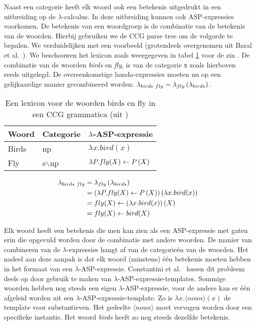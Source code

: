 Naast een categorie heeft elk woord ook een betekenis uitgedrukt in een uitbreiding op de $\lambda$-calcalus. In deze uitbreiding kunnen ook ASP-expressies voorkomen. De betekenis van een woordgroep is de combinatie van de betekenis van de woorden. Hierbij gebruiken we de CCG parse tree om de volgorde te bepalen. We verduidelijken met een voorbeeld (grotendeels overgenomen uit Baral et al.\ \cite{Baral2008}). We beschouwen het lexicon zoals weergegeven in tabel \ref{table:CCG} voor de zin . De combinatie van de woorden \textit{birds} en \textit{fly}, is van de categorie \texttt{s} zoals hierboven reeds uitgelegd. De overeenkomstige lamda-expressies moeten nu op een gelijkaardige manier gecombineerd worden: $\lambda_{birds\ fly}=\app{\lambda_{fly}}{\lambda_{birds}}$.

\begin{table}
  \centering
  \begin{tabular}{|l|l|l|}
    \hline
    Woord & Categorie & $\lambda$-ASP-expressie \\
    \hline
    \hline
    Birds & np & $\lambda x.bird(x)$ \\
    Fly & s$\backslash$np & $\lambda P.fly(X) \leftarrow P \left( X \right)$ \\
    \hline
  \end{tabular}
  \caption{Een lexicon voor de woorden birds en fly in een CCG grammatica (uit \cite{Baral2008})}
  \label{table:CCG}
\end{table}

\begin{equation}
  \label{eq:lambda}
  \begin{aligned}
  \lambda_{birds\ fly} &= \lambda_{fly} \left( \lambda_{birds} \right) \\
          &= (\lambda P.fly(X) \leftarrow P \left( X \right)) \left( \lambda x.bird(x) \right) \\
          &= fly(X) \leftarrow (\lambda x.bird(x)) \left( X \right) \\
          &= fly(X) \leftarrow bird(X)
  \end{aligned}
\end{equation}

Elk woord heeft een betekenis die men kan zien als een ASP-expressie met gaten erin die opgevuld worden door de combinatie met andere woorden. De manier van combineren van de $\lambda$-expressies hangt af van de categorie\"en van de woorden. Het nadeel aan deze aanpak is dat elk woord (minstens) \'e\'en betekenis moeten hebben in het formaat van een $\lambda$-ASP-expressie. Constantini et al.\ \cite{Costantini2010} lossen dit probleem deels op door gebruik te maken van $\lambda$-ASP-expressie-templates. Sommige woorden hebben nog steeds een eigen $\lambda$-ASP-expressie, voor de andere kan er \'e\'en afgeleid worden uit een $\lambda$-ASP-expressie-template. Zo is $\lambda x. \langle noun \rangle(x)$ de template voor substantieven. Het gedeelte $\langle noun \rangle$ moet vervagen worden door een specifieke instantie. Het woord \textit{birds} heeft zo nog steeds dezelfde betekenis.

